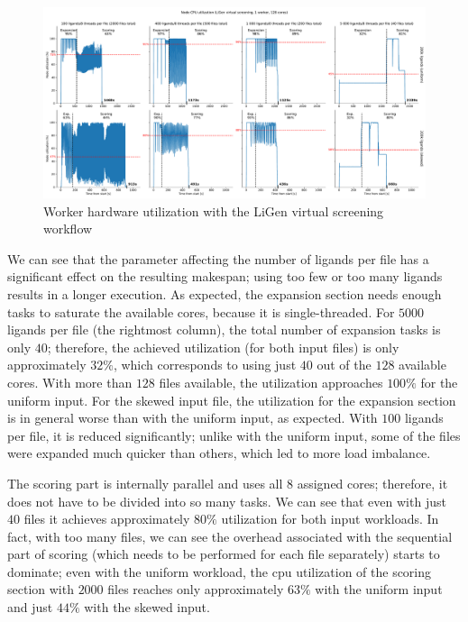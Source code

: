 \begin{figure}[h]
	\centering
	\includegraphics[width=\textwidth]{imgs/hq/charts/ligen-aggregation-utilization}
	\caption{Worker hardware utilization with the LiGen virtual screening workflow}
	\label{fig:hq-ligen-utilization}
\end{figure}

We can see that the parameter affecting the number of ligands per file has a significant effect on
the resulting makespan; using too few or too many ligands results in a longer execution. As
expected, the expansion section needs enough tasks to saturate the available cores, because it is
single-threaded. For $5000$ ligands per file (the rightmost column), the total
number of expansion tasks is only $40$; therefore, the achieved utilization (for
both input files) is only approximately $32\%$, which corresponds to using just
$40$ out of the $128$ available cores. With more than
$128$ files available, the utilization approaches $100\%$ for the
uniform input. For the skewed input file, the utilization for the expansion section is in general
worse than with the uniform input, as expected. With $100$ ligands per file, it
is reduced significantly; unlike with the uniform input, some of the files were expanded much
quicker than others, which led to more load imbalance.

The scoring part is internally parallel and uses all $8$ assigned cores;
therefore, it does not have to be divided into so many tasks. We can see that even with just
$40$ files it achieves approximately $80\%$ utilization for
both input workloads. In fact, with too many files, we can see the overhead associated with the
sequential part of scoring (which needs to be performed for each file separately) starts to
dominate; even with the uniform workload, the \gls{cpu} utilization of the scoring
section with $2000$ files reaches only approximately $63\%$ with
the uniform input and just $44\%$ with the skewed input.

